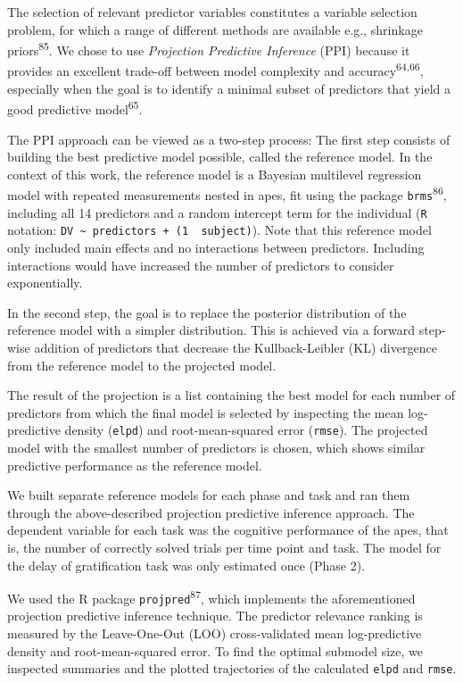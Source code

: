 \documentclass[
  man,floatsintext]{apa6}
\begin{document}
The selection of relevant predictor variables constitutes a variable selection problem, for which a range of different methods are available e.g., shrinkage priors\textsuperscript{85}. We chose to use \emph{Projection Predictive Inference} (PPI) because it provides an excellent trade-off between model complexity and accuracy\textsuperscript{64,66}, especially when the goal is to identify a minimal subset of predictors that yield a good predictive model\textsuperscript{65}.

The PPI approach can be viewed as a two-step process: The first step consists of building the best predictive model possible, called the reference model. In the context of this work, the reference model is a Bayesian multilevel regression model with repeated measurements nested in apes, fit using the package \texttt{brms}\textsuperscript{86}, including all 14 predictors and a random intercept term for the individual (\texttt{R} notation: \texttt{DV\ \textasciitilde{}\ predictors\ +\ (1\ \textbar{}\ subject)}). Note that this reference model only included main effects and no interactions between predictors. Including interactions would have increased the number of predictors to consider exponentially.

In the second step, the goal is to replace the posterior distribution of the reference model with a simpler distribution. This is achieved via a forward step-wise addition of predictors that decrease the Kullback-Leibler (KL) divergence from the reference model to the projected model.

The result of the projection is a list containing the best model for each number of predictors from which the final model is selected by inspecting the mean log-predictive density (\texttt{elpd}) and root-mean-squared error (\texttt{rmse}). The projected model with the smallest number of predictors is chosen, which shows similar predictive performance as the reference model.

We built separate reference models for each phase and task and ran them through the above-described projection predictive inference approach. The dependent variable for each task was the cognitive performance of the apes, that is, the number of correctly solved trials per time point and task. The model for the delay of gratification task was only estimated once (Phase 2).

We used the R package \texttt{projpred}\textsuperscript{87}, which implements the aforementioned projection predictive inference technique. The predictor relevance ranking is measured by the Leave-One-Out (LOO) cross-validated mean log-predictive density and root-mean-squared error. To find the optimal submodel size, we inspected summaries and the plotted trajectories of the calculated \texttt{elpd} and \texttt{rmse}.
\end{document}

